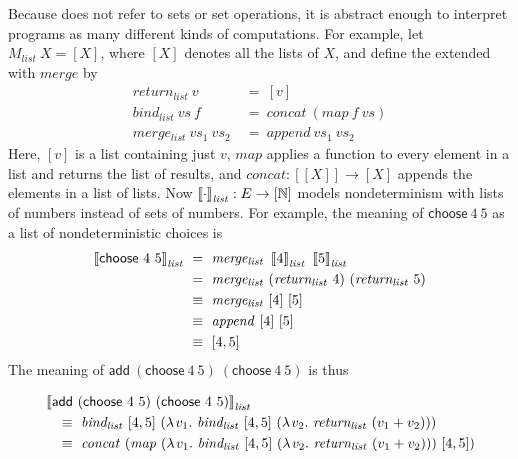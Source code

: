 {Because  does not refer to sets or set operations, it is abstract enough to interpret programs as many different kinds of computations.
For example, let $M_\mathit{list}~X = [X]$, where $[X]$ denotes all the lists of $X$, and define the  extended with $\mathit{merge}$ by
\begin{equation}
\begin{aligned}
	\mathit{return_{list}}~v &\ =\ [v]
\\
	\mathit{bind_{list}}~\mathit{vs}~f &\ =\ \mathit{concat}~(\mathit{map}~f~\mathit{vs})
\\
	\mathit{merge_{list}}~\mathit{vs}_1~\mathit{vs}_2 &\ =\ \mathit{append}~\mathit{vs}_1~\mathit{vs}_2
\end{aligned}
\end{equation}
Here, $[v]$ is a list containing just $v$, $\mathit{map}$ applies a function to every element in a list and returns the list of results, and $\mathit{concat} : [[X]] \to [X]$ appends the elements in a list of lists.
Now $\left\llbracket{\cdot}\right\rrbracket_\mathit{list} : E \to [\mathbb{N}]$ models nondeterminism with lists of numbers instead of sets of numbers.
For example, the meaning of $\mathsf{choose}~4~5$ as a list of nondeterministic choices is
\begin{equation}
\begin{aligned}
	\meaningof{\mathsf{choose}~4~5}_\mathit{list}
	&\ =\ \mathit{merge_{list}}~\meaningof{4}_\mathit{list}~\meaningof{5}_\mathit{list}
\\
	&\ =\ \mathit{merge_{list}}~(\mathit{return_{list}}~4)~(\mathit{return_{list}}~5)
\\
	&\ \equiv\ \mathit{merge_{list}}~[4]~[5]
\\
	&\ \equiv\ \mathit{append}~[4]~[5]
\\
	&\ \equiv\ [4,5]
\label{eqn:list-monad-derivation1}
\end{aligned}
\end{equation}
The meaning of $\mathsf{add}~(\mathsf{choose}~4~5)~(\mathsf{choose}~4~5)$ is thus
\begin{displaybreaks}
\begin{align*}
	&\meaningof{\mathsf{add}~(\mathsf{choose}~4~5)~(\mathsf{choose}~4~5)}_\mathit{list}
\\*
	&\tab \equiv\ \mathit{bind_\mathit{list}}~[4,5]~(\fun{v_1} \mathit{bind_\mathit{list}}~[4,5]~(\fun{v_2} \mathit{return_{list}}~(v_1 + v_2)))
\\
	&\tab \equiv\ \mathit{concat}~(\mathit{map}~(\fun{v_1} \mathit{bind_\mathit{list}}~[4,5]~(\fun{v_2} \mathit{return_{list}}~(v_1 + v_2)))~[4,5])

\end{align*}
\end{displaybreaks}}
